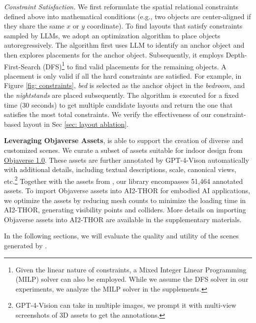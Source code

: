 \noindent \textit{Constraint Satisfaction.} We first reformulate the spatial relational constraints defined above into mathematical conditions (e.g., two objects are center-aligned if they share the same $x$ or $y$ coordinate). To find layouts that satisfy constraints sampled by LLMs, we adopt an optimization algorithm to place objects autoregressively. The algorithm first uses LLM to identify an anchor object and then explores placements for the anchor object. Subsequently, it employs Depth-First-Search (DFS)\footnote{Given the linear nature of constraints, a Mixed Integer Linear Programming (MILP) solver can also be employed. While we assume the DFS solver in our experiments, we analyze the MILP solver in the supplements.} to find valid placements for the remaining objects. A placement is only valid if all the hard constraints are satisfied.
For example, in Figure \ref{fig: constraints}, \textit{bed} is selected as the anchor object in the \textit{bedroom}, and the \textit{nightstands} are placed subsequently. The algorithm is executed for a fixed time (30 seconds) to get multiple candidate layouts and return the one that satisfies the most total constraints. We verify the effectiveness of our constraint-based layout in Sec \ref{sec: layout ablation}.





\smallbreak
\noindent \textbf{Leveraging Objaverse Assets}, \holodeck is able to support the creation of diverse and customized scenes. 
We curate a subset of assets suitable for indoor design from \href{https://objaverse.allenai.org/objaverse-1.0/}{Objaverse 1.0}. These assets are further annotated by GPT-4-Vison \cite{openai_2023_gpt4vision} automatically with additional details, including textual descriptions, scale, canonical views, etc.\footnote{GPT-4-Vision can take in multiple images, we prompt it with multi-view screenshots of 3D assets to get the annotations.} Together with the assets from \procthor, our library encompasses 51,464 annotated assets.
To import Objaverse assets into AI2-THOR for embodied AI applications, we optimize the assets by reducing mesh counts to minimize the loading time in AI2-THOR, generating visibility points and colliders. More details on importing Objaverse assets into AI2-THOR are available in the supplementary materials.



In the following sections, we will evaluate the quality and utility of the scenes generated by \holodeck.

